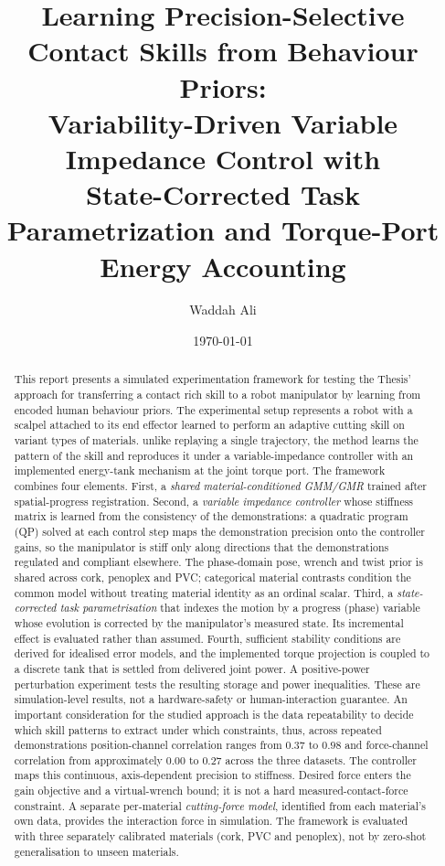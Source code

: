 \documentclass[11pt,a4paper]{article}
\title{\textbf{Learning Precision-Selective Contact Skills from Behaviour Priors:\\
Variability-Driven Variable Impedance Control with\\
State-Corrected Task Parametrization and Torque-Port Energy Accounting}}
\author{Waddah Ali}
\date{\today}
\begin{document}
\maketitle

\begin{abstract}
This report presents a simulated experimentation framework for testing the Thesis' approach for
transferring a contact rich skill to a robot manipulator by learning
from encoded human behaviour priors. The experimental setup represents a robot with a scalpel attached to
its end effector learned to perform an adaptive cutting skill on variant types of materials.
unlike replaying a single trajectory, the method learns the pattern of the skill and
reproduces it under a variable-impedance controller with an implemented
energy-tank mechanism at the joint torque port. The framework combines four
elements. First, a \emph{shared material-conditioned GMM/GMR} trained after
spatial-progress registration. Second, a \emph{variable impedance
controller} whose stiffness matrix is learned from the consistency of
the demonstrations: a quadratic program (QP) solved at each control step maps the
demonstration precision onto the controller gains, so the manipulator is stiff
only along directions that the demonstrations regulated and compliant elsewhere.
The phase-domain pose, wrench and twist prior is shared across cork, penoplex
and PVC; categorical material contrasts condition the common model without
treating material identity as an ordinal scalar.
Third, a \emph{state-corrected task parametrisation} that indexes the motion by a
progress (phase) variable whose evolution is corrected by the manipulator's
measured state. Its incremental effect is evaluated rather than assumed.
Fourth, sufficient stability conditions are derived for idealised error models,
and the implemented torque projection is coupled to a discrete tank that is
settled from delivered joint power. A positive-power perturbation experiment
tests the resulting storage and power inequalities. These are simulation-level
results, not a hardware-safety or human-interaction guarantee. An important
consideration for the studied approach is the data repeatability to decide
which skill patterns to extract under which constraints, thus, across repeated demonstrations
position-channel correlation ranges from $0.37$ to $0.98$ and force-channel
correlation from approximately $0.00$ to $0.27$ across the three datasets.
The controller maps this continuous, axis-dependent precision to stiffness.
Desired force enters the gain objective and a virtual-wrench bound; it is not a
hard measured-contact-force constraint. A separate
per-material \emph{cutting-force model}, identified from each material's own data,
provides the interaction force in simulation. The framework is evaluated with
three separately calibrated materials (cork, PVC and penoplex), not by zero-shot
generalisation to unseen materials.
\end{abstract}
\end{document}
